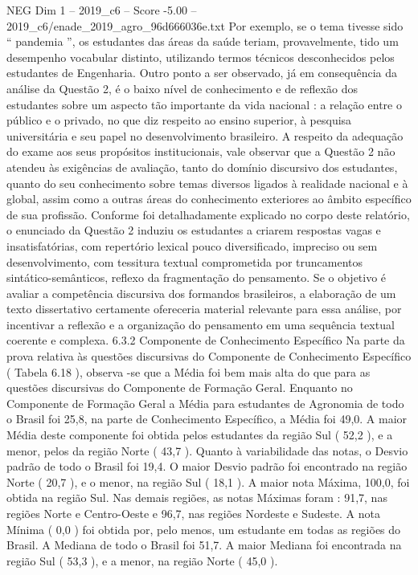 \begin{textsample}{NEG Dim 1 – 2019\_c6 – Score -5.00 – 2019\_c6/enade\_2019\_agro\_96d666036e.txt}
Por exemplo, se o tema tivesse sido “ pandemia ”, os estudantes das áreas da saúde teriam, provavelmente, tido um desempenho vocabular distinto, utilizando termos técnicos desconhecidos pelos estudantes de Engenharia.
Outro ponto a ser observado, já em consequência da análise da Questão 2, é o baixo nível de conhecimento e de reflexão dos estudantes sobre um aspecto tão importante da vida nacional : a relação entre o público e o privado, no que diz respeito ao ensino superior, à pesquisa universitária e seu papel no desenvolvimento brasileiro.
A respeito da adequação do exame aos seus propósitos institucionais, vale observar que a Questão 2 não atendeu às exigências de avaliação, tanto do domínio discursivo dos estudantes, quanto do seu conhecimento sobre temas diversos ligados à realidade nacional e à global, assim como a outras áreas do conhecimento exteriores ao âmbito específico de sua profissão.
Conforme foi detalhadamente explicado no corpo deste relatório, o enunciado da Questão 2 induziu os estudantes a criarem respostas vagas e insatisfatórias, com repertório lexical pouco diversificado, impreciso ou sem desenvolvimento, com tessitura textual comprometida por truncamentos sintático-semânticos, reflexo da fragmentação do pensamento.
Se o objetivo é avaliar a competência discursiva dos formandos brasileiros, a elaboração de um texto dissertativo certamente ofereceria material relevante para essa análise, por incentivar a reflexão e a organização do pensamento em uma sequência textual coerente e complexa. 6.3.2 Componente de Conhecimento Específico Na parte da prova relativa às questões discursivas do Componente de Conhecimento Específico ( Tabela 6.18 ), observa -se que a Média foi bem mais alta do que para as questões discursivas do Componente de Formação Geral.
Enquanto no Componente de Formação Geral a Média para estudantes de Agronomia de todo o Brasil foi 25,8, na parte de Conhecimento Específico, a Média foi 49,0.
A maior Média deste componente foi obtida pelos estudantes da região Sul ( 52,2 ), e a menor, pelos da região Norte ( 43,7 ).
Quanto à variabilidade das notas, o Desvio padrão de todo o Brasil foi 19,4.
O maior Desvio padrão foi encontrado na região Norte ( 20,7 ), e o menor, na região Sul ( 18,1 ).
A maior nota Máxima, 100,0, foi obtida na região Sul.
Nas demais regiões, as notas Máximas foram : 91,7, nas regiões Norte e Centro-Oeste e 96,7, nas regiões Nordeste e Sudeste.
A nota Mínima ( 0,0 ) foi obtida por, pelo menos, um estudante em todas as regiões do Brasil.
A Mediana de todo o Brasil foi 51,7.
A maior Mediana foi encontrada na região Sul ( 53,3 ), e a menor, na região Norte ( 45,0 ).

\end{textsample}
